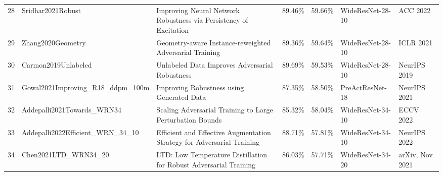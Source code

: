\begin{table}[]
\begin{tabular}{lllllll}
    28 & Sridhar2021Robust                        & Improving Neural Network Robustness via Persistency of Excitation                                                  & 89.46\%        & 59.66\%         & WideResNet-28-10                                                  & ACC 2022                                                   \\
    29 & Zhang2020Geometry                        & Geometry-aware Instance-reweighted Adversarial Training                                                            & 89.36\%        & 59.64\%         & WideResNet-28-10                                                  & ICLR 2021                                                  \\
    30 & Carmon2019Unlabeled                      & Unlabeled Data Improves Adversarial Robustness                                                                     & 89.69\%        & 59.53\%         & WideResNet-28-10                                                  & NeurIPS 2019                                               \\
    31 & Gowal2021Improving\_R18\_ddpm\_100m      & Improving Robustness using Generated Data                                                                          & 87.35\%        & 58.50\%         & PreActResNet-18                                                   & NeurIPS 2021                                               \\
    32 & Addepalli2021Towards\_WRN34              & Scaling Adversarial Training to Large Perturbation Bounds                                                          & 85.32\%        & 58.04\%         & WideResNet-34-10                                                  & ECCV 2022                                                  \\
    33 & Addepalli2022Efficient\_WRN\_34\_10      & Efficient and Effective Augmentation Strategy for Adversarial Training                                             & 88.71\%        & 57.81\%         & WideResNet-34-10                                                  & NeurIPS 2022                                               \\
    34 & Chen2021LTD\_WRN34\_20                   & LTD: Low Temperature Distillation for Robust Adversarial Training                                                  & 86.03\%        & 57.71\%         & WideResNet-34-20                                                  & arXiv, Nov 2021                                            \\

\end{tabular}
\end{table}
